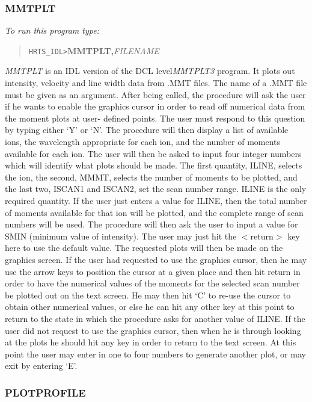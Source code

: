 \subsubsection{MMTPLT}

{\em To run this program type:}
\begin{quote}
{\tt HRTS\_IDL>}{\bf MMTPLT,}{\it FILENAME}
\end{quote}
{\em MMTPLT} is an
IDL version of the DCL level{\em  MMTPLT3} program.  It plots out intensity,
velocity and line width data from .MMT files.  The name of a .MMT file must be
given as an argument.  After being called, the procedure will ask the user if
he wants to enable the graphics cursor in order to read off numerical data from
the moment plots at user- defined points.  The user must respond to this
question by typing either `Y' or `N'.  The procedure will then display a list
of available ions, the wavelength appropriate for each ion, and the number of
moments available for each ion.  The user will then be asked to input four
integer numbers which will identify what plots should be made. The first
quantity, ILINE, selects the ion, the second, MMMT, selects the number of
moments to be plotted, and the last two, ISCAN1 and ISCAN2, set the scan number
range. ILINE is the only required quantity. If the user just enters a value for
ILINE, then the total number of moments available for that ion will be plotted,
and the complete range of scan numbers will be used.  The procedure will then
ask the user to input a value for SMIN (minimum value of intensity).  The user
may just hit the $<$return$>$ key here to use the default value.  The requested
plots
will then be made on the graphics screen.  If the user had requested to use the
graphics cursor, then he may use the arrow keys to position the cursor at a
given place and then hit return in order to have the numerical values of the
moments for the selected scan number be plotted out on the text screen.  He may
then hit `C' to re-use the cursor to obtain other numerical values, or else he
can hit any other key at this point to return to the state in which the
procedure asks for another value of ILINE.  If the user did not request to use
the graphics cursor, then when he is through looking at the plots he should hit
any key in order to return to the text screen.  At this point the user may
enter in one to four numbers to generate another plot, or may exit by entering
`E'.

\subsubsection{PLOTPROFILE}

